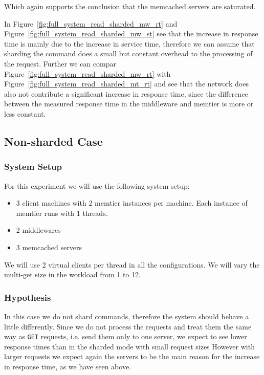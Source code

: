 \documentclass[11pt,a4paper]{article}
\begin{document}
%
Which again supports the conclusion that the memcached servers are saturated.
%
\par
%
In Figure~\ref{fig:full_system_read_sharded_mw_rt} and Figure~\ref{fig:full_system_read_sharded_mw_st} see that the increase in response time is mainly due to the increase in service time, therefore we can assume that sharding the command does a small but constant overhead to the processing of the request.
%
Further we can compar Figure~\ref{fig:full_system_read_sharded_mw_rt} with Figure~\ref{fig:full_system_read_sharded_mt_rt} and see that the network does also not contribute a significant increase in response time, since the difference between the measured response time in the middleware and memtier is more or less constant.
%
\subsection{Non-sharded Case}
%
\subsubsection{System Setup}
%
For this experiment we will use the following system setup:
%
\begin{itemize}
	\item 3 client machines with 2 memtier instances per machine. Each instance of memtier runs with 1 threads.
	\item 2 middlewares
	\item 3 memcached servers
\end{itemize}
%
We will use 2 virtual clients per thread in all the configurations.
%
We will vary the multi-get size in the workload from 1 to 12.
%
\subsubsection{Hypothesis}
%
In this case we do not shard commands, therefore the system should behave a little differently.
%
Since we do not process the requests and treat them the same way as \texttt{GET} requests, i.e. send them only to one server, we expect to see lower response times than in the sharded mode with small request sizes
%
However with larger requests we expect again the servers to be the main reason for the increase in response time, as we have seen above.
%
\end{document}
